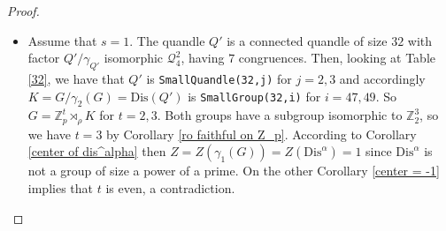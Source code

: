 \documentclass[a4paper, english, 9pt]{amsart}
\theoremstyle{plain}
\newtheorem{proposition}[theorem]{Proposition}
\theoremstyle{definition}
\def\dis{\mathrm{Dis}}
\def\con{\mathrm{Con}}
\def\comment#1{{\color{red} #1}}
\def\Z{\mathbb Z}
\begin{document}
\begin{proof}
\begin{itemize}
\item Assume that $s=1$. The quandle $Q'$ is a connected quandle of size $32$ with factor $Q'/\gamma_{Q'}$ isomorphic $\mathcal{Q}_4^2$, having $7$ congruences. Then, looking at Table \ref{32}, we have that $Q'$ is {\tt SmallQuandle(32,j)} for $j=2,3$ and accordingly $K=G/\gamma_2(G)=\dis(Q')$ is {\tt SmallGroup(32,i)} for $i=47,49$. So $G=\Z_p^t\rtimes_\rho K$ for $t=2,3$. Both groups have a subgroup isomorphic to $\Z_2^3$, so we have $t=3$ by Corollary \ref{ro faithful on Z_p}. According to Corollary \ref{center of dis^alpha} then $Z=Z(\gamma_1(G))=Z(\dis^{\alpha})=1$ since $\dis^\alpha$ is not a group of size a power of a prime. On the other Corollary \ref{center = -1} implies that $t$ is even, a contradiction. \qedhere%
%
\end{itemize}

%
%
%
\end{proof}




\end{document}
